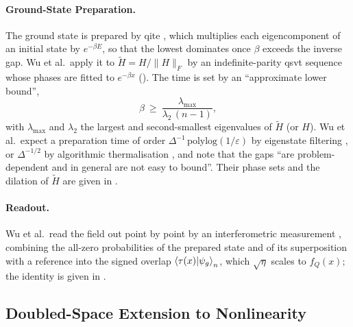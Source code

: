 \paragraph{Ground-State Preparation.} The ground state is prepared by \gls{qite} \cite{motta2020qite}, which multiplies each eigencomponent of an initial state by $e^{-\beta E}$, so that the lowest dominates once $\beta$ exceeds the inverse gap. Wu et al.\ apply it to $\tilde H=H/\|H\|_F$ by an indefinite-parity \gls{qsvt} sequence \cite{gilyen2019qsvt} whose phases are fitted to $e^{-\beta x}$ (). The time is set by an ``approximate lower bound'',
\begin{equation}
    \beta\ \ge\ \frac{\lambda_{\max}}{\lambda_2\,(n-1)},
    \label{eq:pihm-time-rule}
\end{equation}
with $\lambda_{\max}$ and $\lambda_2$ the largest and second-smallest eigenvalues of $\tilde H$ (or $H$). Wu et al.\ expect a preparation time of order $\Delta^{-1}\,\mathrm{polylog}(1/\varepsilon)$ by eigenstate filtering \cite{lintong2020groundstate}, or $\Delta^{-1/2}$ by algorithmic thermalisation \cite{chen2023thermal}, and note that the gaps ``are problem-dependent and in general are not easy to bound''. Their phase sets and the dilation of $\tilde H$ are given in .

\paragraph{Readout.} Wu et al.\ read the field out point by point by an interferometric measurement \cite{kyriienko2020inverse,scali2023topological}, combining the all-zero probabilities of the prepared state and of its superposition with a reference into the signed overlap $\braket{\tau(x)|\psi_g}_n$, which $\sqrt{\eta}$ scales to $f_Q(x)$; the identity is given in .

\subsection{Doubled-Space Extension to Nonlinearity}
\label{sec:pihm-doubled}

